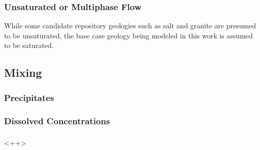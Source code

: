 \subsubsection{Unsaturated or Multiphase Flow}
While some candidate repository geologies such as salt and granite are presumed 
to be unsaturated, the base case geology being modeled in this work is assumed 
to be saturated.

\subsection{Mixing}

\subsubsection{Precipitates}

\subsubsection{Dissolved Concentrations}

\subsubsection{}<++>



